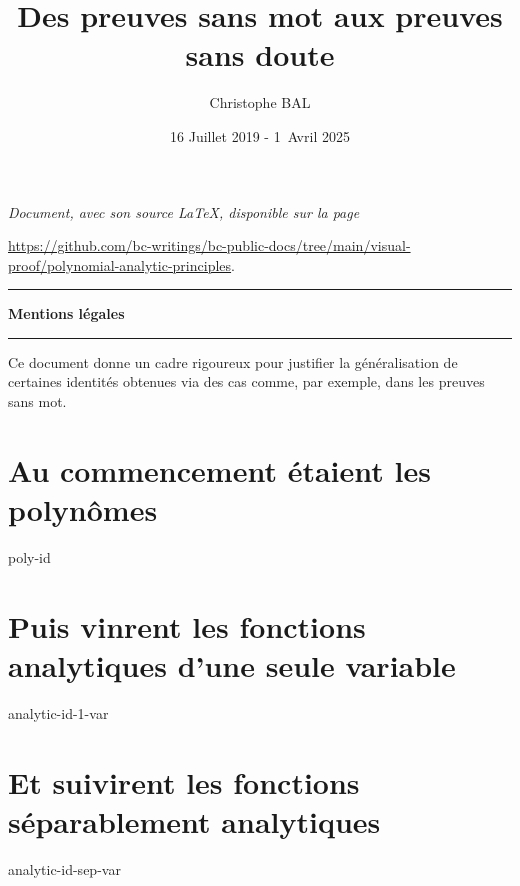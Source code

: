 \documentclass[12pt]{amsart}
\begin{document}
\title{Des preuves sans mot aux preuves sans doute}
\author{Christophe BAL}
\date{16 Juillet 2019 - 1\ier\ Avril 2025}

\maketitle

\begin{center}
	\itshape
	Document, avec son source \LaTeX, disponible sur la page

	\url{https://github.com/bc-writings/bc-public-docs/tree/main/visual-proof/polynomial-analytic-principles}.
\end{center}


\bigskip


\begin{center}
	\hrule\vspace{.3em}
	{
		\fontsize{1.35em}{1em}\selectfont
		\textbf{Mentions \og légales \fg}
	}

	\vspace{0.45em}
	\doclicenseThis
	\hrule
\end{center}


\bigskip


\setcounter{tocdepth}{1}
\tableofcontents



\newpage

\begin{meta-abstract*}
	Ce document donne un cadre rigoureux pour justifier la généralisation de certaines identités obtenues via des cas  comme, par exemple, dans les preuves sans mot. 
\end{meta-abstract*}




\section{Au commencement étaient les polynômes}

{poly-id}




\newpage
\section{Puis vinrent les fonctions analytiques d'une seule variable}

{analytic-id-1-var}




\newpage
\section{Et suivirent les fonctions séparablement analytiques}

{analytic-id-sep-var}
\end{document}
